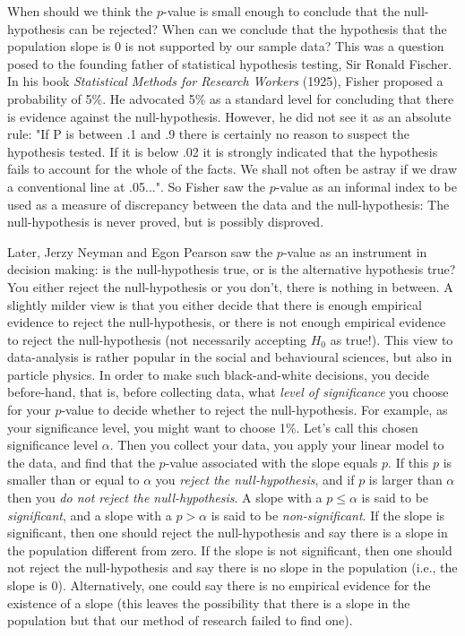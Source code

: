 \documentclass[]{book}\usepackage[]{graphicx}\usepackage[]{color}
\begin{document}
When should we think the $p$-value is small enough to conclude that the null-hypothesis can be rejected? When can we conclude that the hypothesis that the population slope is 0 is not supported by our sample data? This was a question posed to the founding father of statistical hypothesis testing, Sir Ronald Fischer. In his book \textit{Statistical Methods for Research Workers} (1925), Fisher proposed a probability of 5\%. He advocated 5\% as a standard level for concluding that there is evidence against the null-hypothesis. However, he did not see it as an absolute rule: "If P is between .1 and .9 there is certainly no reason to suspect the hypothesis tested. If it is below .02 it is strongly indicated that the hypothesis fails to account for the whole of the facts. We shall not often be astray if we draw a conventional line at .05...". So Fisher saw the $p$-value as an informal index to be used as a measure of discrepancy between the data and the null-hypothesis: The null-hypothesis is never proved, but is possibly disproved.


Later, Jerzy Neyman and Egon Pearson saw the $p$-value as an instrument in decision making: is the null-hypothesis true, or is the alternative hypothesis true? You either reject the null-hypothesis or you don't, there is nothing in between. A slightly milder view is that you either decide that there is enough empirical evidence to reject the null-hypothesis, or there is not enough empirical evidence to reject the null-hypothesis (not necessarily accepting $H_0$ as true!). This view to data-analysis is rather popular in the social and behavioural sciences, but also in particle physics. In order to make such black-and-white decisions, you decide before-hand, that is, before collecting data, what \textit{level of significance} you choose for your $p$-value to decide whether to reject the null-hypothesis. For example, as your significance level, you might want to choose 1\%. Let's call this chosen significance level $\alpha$. Then you collect your data, you apply your linear model to the data, and find that the $p$-value associated with the slope equals $p$. If this $p$ is smaller than or equal to $\alpha$ you \textit{reject the null-hypothesis}, and if $p$ is larger than $\alpha$ then you \textit{do not reject the null-hypothesis}. A slope with a $p \leq \alpha$ is said to be \textit{significant}, and a slope with a $p > \alpha$ is said to be \textit{non-significant}. If the slope is significant, then one should reject the null-hypothesis and say there is a slope in the population different from zero. If the slope is not significant, then one should not reject the null-hypothesis and say there is no slope in the population (i.e., the slope is 0). Alternatively, one could say there is no empirical evidence for the existence of a slope (this leaves the possibility that there is a slope in the population but that our method of research failed to find one).
\end{document}
